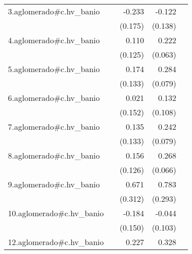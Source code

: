 {\begin{longtable}{l*{4}{D{.}{.}{-1}}}
\addlinespace
3.aglomerado#c.hv\_banio&                     &      -0.233         &      -0.122         &                     \\
            &                     &     (0.175)         &     (0.138)         &                     \\
\addlinespace
4.aglomerado#c.hv\_banio&                     &       0.110         &       0.222\sym{***}&                     \\
            &                     &     (0.125)         &     (0.063)         &                     \\
\addlinespace
5.aglomerado#c.hv\_banio&                     &       0.174         &       0.284\sym{***}&                     \\
            &                     &     (0.133)         &     (0.079)         &                     \\
\addlinespace
6.aglomerado#c.hv\_banio&                     &       0.021         &       0.132         &                     \\
            &                     &     (0.152)         &     (0.108)         &                     \\
\addlinespace
7.aglomerado#c.hv\_banio&                     &       0.135         &       0.242\sym{**} &                     \\
            &                     &     (0.133)         &     (0.079)         &                     \\
\addlinespace
8.aglomerado#c.hv\_banio&                     &       0.156         &       0.268\sym{***}&                     \\
            &                     &     (0.126)         &     (0.066)         &                     \\
\addlinespace
9.aglomerado#c.hv\_banio&                     &       0.671\sym{*}  &       0.783\sym{**} &                     \\
            &                     &     (0.312)         &     (0.293)         &                     \\
\addlinespace
10.aglomerado#c.hv\_banio&                     &      -0.184         &      -0.044         &                     \\
            &                     &     (0.150)         &     (0.103)         &                     \\
\addlinespace
12.aglomerado#c.hv\_banio&                     &       0.227         &       0.328\sym{**} &                     \\

\end{longtable}}
